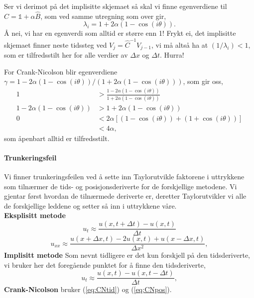 \documentclass[norsk, 10pt]{article}
\begin{document}
Ser vi derimot på det implisitte skjemaet så skal vi finne egenverdiene til $\hat C = \mathbb 1 + \alpha \hat B$, som ved samme utregning som over gir,
$$ \lambda_i = 1 + 2\alpha(1-\cos(i\theta)). $$
Å nei, vi har en egenverdi som alltid er større enn 1! Frykt ei, det implisitte skjemaet finner neste tidssteg ved $ V_j = \hat C^{-1} V_{j-1}$, vi må altså ha at $(1/\lambda_i) < 1$, som er tilfredsstilt her for alle verdier av $\Delta x$ og $\Delta t$. Hurra!

For Crank-Nicolson blir egenverdiene $\gamma = 1-2\alpha(1 - \cos(i\theta) ) / (1 + 2\alpha(1-\cos(i\theta)))$, som gir oss,
\begin{align*}
	1 &> \frac{1-2\alpha(1 - \cos(i\theta) )}{1 + 2\alpha(1-\cos(i\theta))} \\
	1-2\alpha(1 - \cos(i\theta) ) &> 1 + 2\alpha(1-\cos(i\theta)) \\
	0 &< 2\alpha[(1-\cos(i\theta)) + (1+\cos(i\theta))] \\
	&< 4\alpha,
\end{align*}
som åpenbart alltid er tilfredsstilt.

\paragraph{Trunkeringsfeil}
Vi finner trunkeringsfeilen ved å sette inn Taylorutvikle faktorene i uttrykkene som tilnærmer de tids- og posisjonsderiverte for de forskjellige metodene. Vi gjentar først hvordan de tilnærmede deriverte er, deretter Taylorutvikler vi alle de forskjellige leddene og setter så inn i uttrykkene våre.\\
\textbf{Eksplisitt metode}
\begin{equation}
u_t\approx \frac{u(x,t+\Delta t)-u(x,t)}{\Delta t}\label{eq:tideksplisitt}
\end{equation}
\begin{equation}
u_{xx}\approx \frac{u(x+\Delta x,t)-2u(x,t)+u(x-\Delta x,t)}{\Delta x^2}, \label{eq:xeksplisitt}
\end{equation}
\textbf{Implisitt metode}
Som nevnt tidligere er det kun forskjell på den tidsderiverte, vi bruker her det foregående punktet for å finne den tidsderiverte,
\begin{equation}
u_t\approx \frac{u(x,t)-u(x,t-\Delta t)}{\Delta t} \label{eq:implisitt},
\end{equation}
\textbf{Crank-Nicolson} bruker (\ref{eq:CNtid}) og (\ref{eq:CNpos}).
\end{document}
